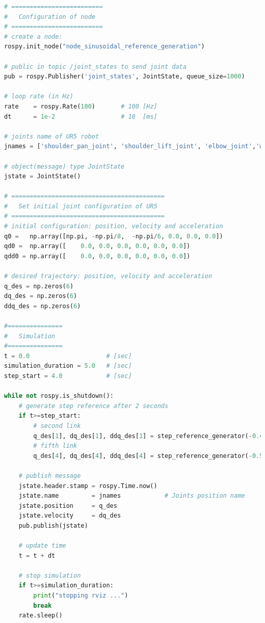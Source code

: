 \begin{lstlisting}[language=Python, caption={Rosnode to move the second and fifth joint of UR5 robot with the requirement motion of activity 1.2.}, label={lst:rosnode_step_reference_generator}]
# =========================
#   Configuration of node
# =========================
# create a node: 
rospy.init_node("node_sinusoidal_reference_generation")

# public in topic /joint_states	to send joint data	
pub = rospy.Publisher('joint_states', JointState, queue_size=1000)

# loop rate (in Hz)
rate 	= rospy.Rate(100)		# 100 [Hz]
dt 		= 1e-2					# 10  [ms]

# joints name of UR5 robot
jnames = ['shoulder_pan_joint', 'shoulder_lift_joint', 'elbow_joint','wrist_1_joint', 'wrist_2_joint', 'wrist_3_joint']

# object(message) type JointState
jstate = JointState()

# ==========================================
#   Set initial joint configuration of UR5
# ==========================================
# initial configuration: position, velocity and acceleration 
q0 =   np.array([np.pi, -np.pi/8,  -np.pi/6, 0.0, 0.0, 0.0])
qd0 =  np.array([    0.0, 0.0, 0.0, 0.0, 0.0, 0.0])
qdd0 = np.array([    0.0, 0.0, 0.0, 0.0, 0.0, 0.0]) 

# desired trajectory: position, velocity and acceleration
q_des = np.zeros(6)
dq_des = np.zeros(6)
ddq_des = np.zeros(6)

#===============
#   Simulation
#===============
t = 0.0                     # [sec] 
simulation_duration = 5.0   # [sec]
step_start = 4.0            # [sec]

while not rospy.is_shutdown():
    # generate step reference after 2 seconds
    if t>=step_start:
        # second link
        q_des[1], dq_des[1], ddq_des[1] = step_reference_generator(-0.4)
        # fifth link
        q_des[4], dq_des[4], ddq_des[4] = step_reference_generator(-0.5)

    # publish message
    jstate.header.stamp = rospy.Time.now()
    jstate.name 		= jnames			# Joints position name
    jstate.position 	= q_des
    jstate.velocity 	= dq_des
    pub.publish(jstate)

    # update time
    t = t + dt
    
    # stop simulation
    if t>=simulation_duration:
        print("stopping rviz ...")
        break
    rate.sleep()

\end{lstlisting}


